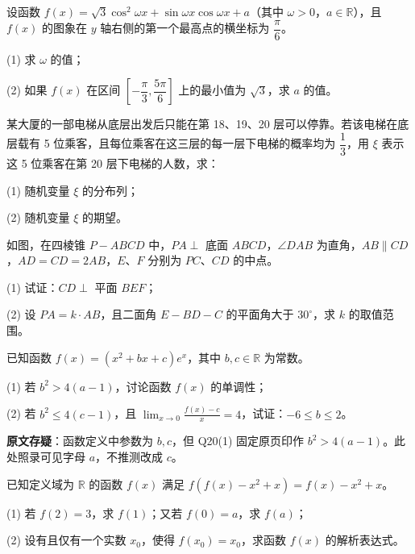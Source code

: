 \begin{question}
设函数 \(f(x)=\sqrt3\cos^2\omega x+\sin\omega x\cos\omega x+a\)（其中 \(\omega>0\)，\(a\in\mathbb R\)），且 \(f(x)\) 的图象在 \(y\) 轴右侧的第一个最高点的横坐标为 \(\dfrac\pi6\)。

(1) 求 \(\omega\) 的值；

(2) 如果 \(f(x)\) 在区间 \(\left[-\dfrac\pi3,\dfrac{5\pi}6\right]\) 上的最小值为 \(\sqrt3\)，求 \(a\) 的值。

\end{question}
\begin{question}
某大厦的一部电梯从底层出发后只能在第 18、19、20 层可以停靠。若该电梯在底层载有 5 位乘客，且每位乘客在这三层的每一层下电梯的概率均为 \(\dfrac13\)，用 \(\xi\) 表示这 5 位乘客在第 20 层下电梯的人数，求：

(1) 随机变量 \(\xi\) 的分布列；

(2) 随机变量 \(\xi\) 的期望。

\Needspace{0.4\textheight}
\end{question}
\begin{question}
如图，在四棱锥 \(P-ABCD\) 中，\(PA\perp\) 底面 \(ABCD\)，\(\angle DAB\) 为直角，\(AB\parallel CD\)，\(AD=CD=2AB\)，\(E、F\) 分别为 \(PC、CD\) 的中点。
\nopagebreak[4]
\begin{center}\end{center}
\nopagebreak[4]
(1) 试证：\(CD\perp\) 平面 \(BEF\)；

(2) 设 \(PA=k\cdot AB\)，且二面角 \(E-BD-C\) 的平面角大于 \(30^\circ\)，求 \(k\) 的取值范围。

\end{question}
\begin{question}
已知函数 \(f(x)=(x^2+bx+c)e^x\)，其中 \(b,c\in\mathbb R\) 为常数。

(1) 若 \(b^2>4(a-1)\)，讨论函数 \(f(x)\) 的单调性；

(2) 若 \(b^2\leq4(c-1)\)，且 \(\displaystyle\lim_{x\to0}\frac{f(x)-c}{x}=4\)，试证：\(-6\leq b\leq2\)。

\begin{gktip}
\textbf{原文存疑}：函数定义中参数为 $b,c$，但 Q20(1) 固定原页印作 $b^2>4(a-1)$。此处照录可见字母 $a$，不推测改成 $c$。
\end{gktip}

\end{question}
\begin{question}
已知定义域为 \(\mathbb R\) 的函数 \(f(x)\) 满足 \(f(f(x)-x^2+x)=f(x)-x^2+x\)。

(1) 若 \(f(2)=3\)，求 \(f(1)\)；又若 \(f(0)=a\)，求 \(f(a)\)；

(2) 设有且仅有一个实数 \(x_0\)，使得 \(f(x_0)=x_0\)，求函数 \(f(x)\) 的解析表达式。

\Needspace{0.4\textheight}
\end{question}
